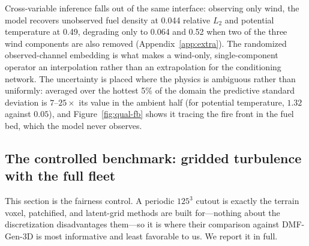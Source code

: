 \documentclass{article} %
\newcommand{\model}{DMF-Gen-3D}
\begin{document}
Cross-variable inference falls out of the same interface: observing only wind, the model recovers unobserved fuel density at 0.044 relative $L_2$ and potential temperature at 0.49, degrading only to 0.064 and 0.52 when two of the three wind components are also removed (Appendix~\ref{app:extra}). The randomized observed-channel embedding is what makes a wind-only, single-component operator an interpolation rather than an extrapolation for the conditioning network. The uncertainty is placed where the physics is ambiguous rather than uniformly: averaged over the hottest 5\% of the domain the predictive standard deviation is $7$--$25\times$ its value in the ambient half (for potential temperature, $1.32$ against $0.05$), and Figure~\ref{fig:qual-fb} shows it tracing the fire front in the fuel bed, which the model never observes.

\subsection{The controlled benchmark: gridded turbulence with the full fleet}
\label{sec:results-jhu}

This section is the fairness control. A periodic $125^3$ cutout is exactly the terrain voxel, patchified, and latent-grid methods are built for---nothing about the discretization disadvantages them---so it is where their comparison against \model{} is most informative and least favorable to us. We report it in full.
\end{document}
